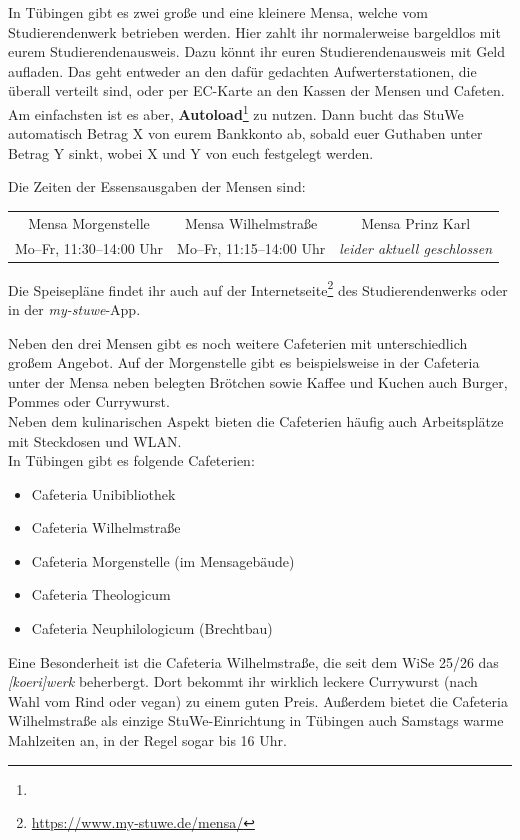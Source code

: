 
In Tübingen gibt es zwei große und eine kleinere Mensa, welche vom
Studierendenwerk betrieben werden. Hier zahlt ihr normalerweise bargeldlos mit
eurem Studierendenausweis. 
Dazu könnt ihr euren Studierendenausweis mit Geld aufladen. Das geht entweder an 
den dafür gedachten Aufwerterstationen, die überall verteilt sind, oder 
per EC-Karte an den Kassen der Mensen und Cafeten. Am einfachsten ist es aber,
\textbf{Autoload}\footnote{}
zu nutzen. 
Dann bucht das StuWe automatisch Betrag X von eurem Bankkonto ab, sobald euer Guthaben unter Betrag Y 
sinkt, wobei X und Y von euch festgelegt werden.

Die Zeiten der Essensausgaben der Mensen sind:
\begin{center}
	\begin{tabular}{ccc}
		Mensa Morgenstelle & Mensa Wilhelmstraße & Mensa Prinz Karl \\
		Mo--Fr, 11:30--14:00 Uhr & Mo--Fr, 11:15--14:00 Uhr & \textit{leider aktuell geschlossen} \\
	\end{tabular}
\end{center}

Die Speisepläne findet ihr auch auf der
Internetseite\footnote{\url{https://www.my-stuwe.de/mensa/}} des
Studierendenwerks oder in der \emph{my-stuwe}-App.

Neben den drei Mensen gibt es noch weitere Cafeterien mit unterschiedlich
großem Angebot. Auf der Morgenstelle gibt es beispielsweise in der Cafeteria
unter der Mensa neben belegten Brötchen sowie Kaffee und Kuchen auch Burger,
Pommes oder Currywurst.\\ Neben dem kulinarischen
Aspekt bieten die Cafeterien häufig auch Arbeitsplätze mit Steckdosen und
WLAN.\\
\vfill \pagebreak
In Tübingen gibt es folgende Cafeterien:
\begin{itemize}
	\setlength\itemsep{0.3em}
	\item Cafeteria Unibibliothek
	\item Cafeteria Wilhelmstraße
	\item Cafeteria Morgenstelle (im Mensagebäude)
	\item Cafeteria Theologicum
	\item Cafeteria Neuphilologicum (Brechtbau)
\end{itemize} 
Eine Besonderheit ist die Cafeteria Wilhelmstraße, die
seit dem WiSe 25/26 das \emph{[koeri]werk} beherbergt. Dort bekommt ihr wirklich
leckere Currywurst (nach Wahl vom Rind oder vegan) zu einem guten Preis. Außerdem bietet
die Cafeteria Wilhelmstraße als einzige StuWe-Einrichtung in Tübingen auch Samstags
warme Mahlzeiten an, in der Regel sogar bis 16 Uhr. 
